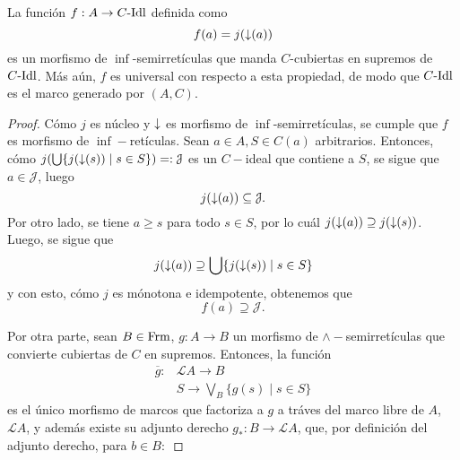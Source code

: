 
\begin{lemma}
    La función $f:A\to C\text{-}\mathrm{Idl}$ definida como
    \begin{equation*}
        f(a)=j({\downarrow}(a))
    \end{equation*}
    es un morfismo de $\inf$-semirretículas que
    manda $C$-cubiertas en supremos de $C\text{-}\mathrm{Idl}$.
    Más aún, $f$ es universal con respecto a esta propiedad,
    de modo que $C\text{-}\mathrm{Idl}$ es el marco generado por $(A,C)$.
\end{lemma}

\begin{proof}
    Cómo $j$ es núcleo y ${\downarrow}$ es morfismo
    de $\inf$-semirretículas,
    se cumple que $f$ es morfismo de $\inf-$retículas.
    Sean $a\in A,S\in C(a)$ arbitrarios. Entonces, cómo $j(\bigcup\{j({\downarrow}(s))\mid s\in S\})=:\mathcal{J}$ es un $C-$ideal que contiene a $S$, se sigue que $a\in\mathcal{J}$, luego 
    \begin{equation*}
        j({\downarrow}(a))\subseteq \mathcal{J}.
    \end{equation*}
    Por otro lado, se tiene $a\geq s$ para todo $s\in S$, por lo cuál $j({\downarrow}(a))\supseteq j({\downarrow}(s))$. Luego, se sigue que
    \begin{equation*}
        j({\downarrow}(a))\supseteq \bigcup\{j({\downarrow}(s))\mid s\in S\}
    \end{equation*}
    y con esto, cómo $j$ es mónotona e idempotente, obtenemos que
    \begin{equation*}
        f(a)\supseteq\mathcal{J}.
    \end{equation*}

    Por otra parte, sean $B\in\mathrm{Frm}$, $g:A\to B$ un morfismo de $\wedge-$semirretículas que convierte cubiertas de $C$ en supremos. Entonces, la función 
    \begin{align*}
        \overline{g}: &\mathcal{L}A\to B \\
                      & S\to \bigvee_B\{g(s)\mid s\in S\}
    \end{align*}
    es el único morfismo de marcos que factoriza a $g$ a tráves del marco libre de $A$, $\mathcal{L}A$, y además existe su adjunto derecho $g_*:B\to\mathcal{L}A$, que, por definición del adjunto derecho, para $b\in B:$


\end{proof}
